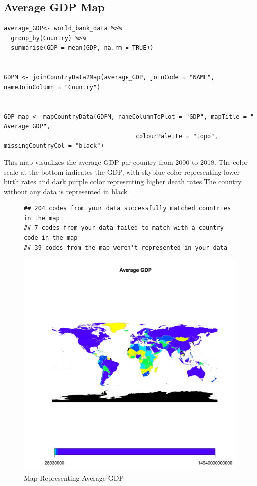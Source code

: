 \documentclass{article}\usepackage[]{graphicx}\usepackage[]{xcolor}
\makeatletter
\def\maxwidth{ %
  \ifdim\Gin@nat@width>\linewidth
    \linewidth
  \else
    \Gin@nat@width
  \fi
}
\newenvironment{kframe}{%
 \def\at@end@of@kframe{}%
 \ifinner\ifhmode%
  \def\at@end@of@kframe{\end{minipage}}%
  \begin{minipage}{\columnwidth}%
 \fi\fi%
 \def\FrameCommand##1{\hskip\@totalleftmargin \hskip-\fboxsep
 \colorbox{shadecolor}{##1}\hskip-\fboxsep
     \hskip-\linewidth \hskip-\@totalleftmargin \hskip\columnwidth}%
 \MakeFramed {\advance\hsize-\width
   \@totalleftmargin\z@ \linewidth\hsize
   \@setminipage}}%
 {\par\unskip\endMakeFramed%
 \at@end@of@kframe}
\newenvironment{knitrout}{}{} %
\makeatother
\begin{document}
\subsection{Average GDP Map}
\begin{lstlisting}
average_GDP<- world_bank_data %>%
  group_by(Country) %>%
  summarise(GDP = mean(GDP, na.rm = TRUE))


GDPM <- joinCountryData2Map(average_GDP, joinCode = "NAME", nameJoinColumn = "Country")


GDP_map <- mapCountryData(GDPM, nameColumnToPlot = "GDP", mapTitle = " Average GDP", 
                                     colourPalette = "topo", missingCountryCol = "black")

\end{lstlisting}
This map visualizes the average GDP per country from 2000 to 2018. The color scale at the bottom indicates the GDP, with skyblue color representing lower birth rates and dark purple color representing higher death rates.The country without any data is represented in black.
\newpage
\begin{figure}[h!]
\centering
\begin{knitrout}
\color{fgcolor}\begin{kframe}
\begin{verbatim}
## 204 codes from your data successfully matched countries in the map
## 7 codes from your data failed to match with a country code in the map
## 39 codes from the map weren't represented in your data
\end{verbatim}
\end{kframe}
\includegraphics[width=\maxwidth]{figure/unnamed-chunk-19-1} 
\end{knitrout}
\caption{Map Representing Average GDP }

\label{fig}
\end{figure}
\end{document}
